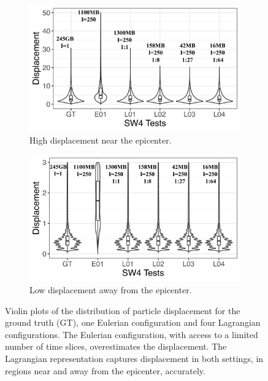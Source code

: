 \documentclass[runningheads]{llncs}
\begin{document}
\begin{figure}[!b]
\vspace{-5mm}
\begin{subfigure}{0.495\textwidth}
\centering
\includegraphics[width=\linewidth]{sw4_violinplot1.pdf}
\vspace{-5mm}
\caption{High displacement near the epicenter.}
\label{fig:epicenter}
\end{subfigure}
\begin{subfigure}{0.495\textwidth}
\centering
\includegraphics[width=\linewidth]{sw4_violinplot2.pdf}
\vspace{-5mm}
\caption{Low displacement away from the epicenter.}
\label{fig:clusters}
\end{subfigure}
\vspace{-2mm}
\caption{Violin plots of the distribution of particle displacement for the ground truth (GT), one Eulerian configuration and four Lagrangian configurations. The Eulerian configuration, with access to a limited number of time slices, overestimates the displacement. The Lagrangian representation captures displacement in both settings, in regions near and away from the epicenter, accurately.}
\vspace{-5mm}
\label{fig:sw4_violinplot}
\end{figure}
\end{document}
